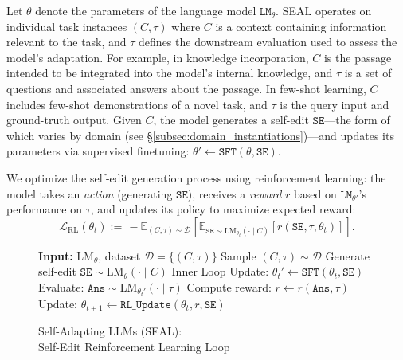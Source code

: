 \documentclass{article}
\newcommand{\methodname}{Self-Adapting LLMs (SEAL)\xspace}
\newcommand{\methodacronym}{SEAL\xspace}
\begin{document}
Let $\theta$ denote the parameters of the language model $\texttt{LM}_\theta$. \methodacronym operates on individual task instances $(C,\tau)$ where $C$ is a context containing information relevant to the task, and $\tau$ defines the downstream evaluation used to assess the model's adaptation. For example, in knowledge incorporation, $C$ is the passage intended to be integrated into the model's internal knowledge, and $\tau$ is a set of questions and associated answers about the passage. In few-shot learning, $C$ includes few-shot demonstrations of a novel task, and $\tau$ is the query input and ground-truth output. Given $C$, the model generates a self-edit $\texttt{SE}$—the form of which varies by domain (see \S\ref{subsec:domain_instantiations})—and updates its parameters via supervised finetuning: $\theta' \leftarrow \texttt{SFT}(\theta, \texttt{SE})$. 

We optimize the self-edit generation process using reinforcement learning: the model takes an \textit{action} (generating $\texttt{SE}$), receives a \textit{reward} $r$ based on $\texttt{LM}_{\theta'}$'s performance on $\tau$, and updates its policy to maximize expected reward:
\vspace{-1pt}
\begin{equation}
\label{eqn:objective}
\mathcal{L}_{\text{RL}}(\theta_t) :=\, 
 -\mathbb{E}_{(C, \tau) \sim \mathcal{D}} \left[ 
    \mathbb{E}_{\texttt{SE} \sim \text{LM}_{\theta_t}(\cdot \mid C)} 
    \left[ r(\texttt{SE}, \tau, \theta_t) \right] 
\right].
\end{equation}

\begin{figure}
\vspace{-23pt}
\begin{minipage}{0.44\textwidth}
\begin{algorithm}[H]
\small
\caption{\methodname: \\Self-Edit Reinforcement Learning Loop}
\label{alg:seel_rl_simplified}
\begin{algorithmic}[1]
\STATE \textbf{Input:} LM$_\theta$, dataset $\mathcal{D} = \{(C, \tau)\}$
    \STATE Sample $(C, \tau) \sim \mathcal{D}$
    \STATE Generate self-edit $\texttt{SE} \sim \text{LM}_{\theta}(\cdot \mid C)$
    \STATE Inner Loop Update: $\theta_t' \leftarrow \texttt{SFT}(\theta_t, \texttt{SE})$
    \STATE Evaluate: $\texttt{Ans} \sim \text{LM}_{\theta_t'}(\cdot \mid \tau)$
    \STATE Compute reward: $r \leftarrow r(\texttt{Ans} , \tau)$
    \STATE Update: $\theta_{t+1} \leftarrow \texttt{RL\_Update}(\theta_t, r, \texttt{SE})$
\ENDFOR
\end{algorithmic}
\end{algorithm}
\end{minipage}
\vspace{-10pt}
\end{figure}
\end{document}
